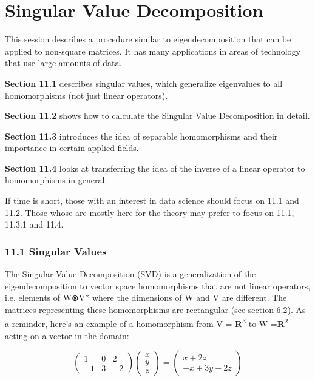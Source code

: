 \documentclass[oneside,english]{amsbook}
\numberwithin{section}{chapter}
\theoremstyle{plain}
\theoremstyle{definition}
\begin{document}
\chapter{Singular Value Decomposition}

This session describes a procedure similar to eigendecomposition that
can be applied to non-square matrices. It has many applications in areas
of technology that use large amounts of data.

\textbf{Section 11.1} describes singular values, which generalize
eigenvalues to all homomorphisms (not just linear operators).

\textbf{Section 11.2} shows how to calculate the Singular Value
Decomposition in detail.

\textbf{Section 11.3} introduces the idea of separable homomorphisms and
their importance in certain applied fields.

\textbf{Section 11.4} looks at transferring the idea of the inverse of a
linear operator to homomorphisms in general.

If time is short, those with an interest in data science should focus on
11.1 and 11.2. Those whose are mostly here for the theory may prefer to
focus on 11.1, 11.3.1 and 11.4.

\subsection{11.1 Singular Values}\label{singular-values}

The Singular Value Decomposition (SVD) is a generalization of the
eigendecomposition to vector space homomorphisms that are not linear
operators, i.e. elements of W⊗V* where the dimensions of W and V are
different. The matrices representing these homomorphisms are rectangular
(see section 6.2). As a reminder, here's an example of a homomorphism
from V = \textbf{R}\textsuperscript{3} to W
=\textbf{R}\textsuperscript{2} acting on a vector in the domain:

\[\begin{pmatrix}
	1 & 0 & 2 \\
	- 1 & 3 & - 2
\end{pmatrix}\begin{pmatrix}
	x \\
	y \\
	z
\end{pmatrix} = \begin{pmatrix}
	x + 2z \\
	- x + 3y - 2z
\end{pmatrix}\]
\end{document}
